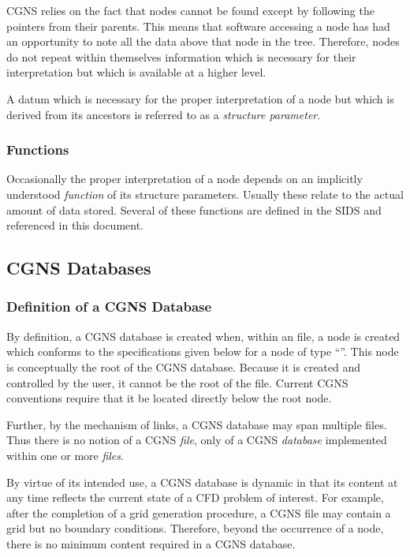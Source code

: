 CGNS relies on the fact that \SLL nodes cannot be found except by
following the pointers from their parents.  This means that software
accessing a node has had an opportunity to note all the data above that
node in the tree. Therefore, nodes do not repeat within themselves
information which is necessary for their interpretation but which is
available at a higher level.

A datum which is necessary for the proper interpretation of a
node but which is derived from its ancestors is referred to as a
\textit{structure parameter}.

\subsubsection{Functions}
\label{s:functions}

Occasionally the proper interpretation of a node depends on
an implicitly understood \emph{function} of its structure
parameters. Usually these relate to the actual amount of data
stored. Several of these functions are defined in the SIDS and
referenced in this document.

\subsection{CGNS Databases}
\label{s:cgns_databases}

\subsubsection{Definition of a CGNS Database}

By definition, a CGNS database is created when, within an \HDF file, a
node is created which conforms to the specifications given below for a
node of type ``''. This node is conceptually the root
of the CGNS database. Because it is created and controlled by the user,
it cannot be the root of the \HDF file.
Current CGNS conventions require that it be located directly below
the \HDF root node.

Further, by the mechanism of links, a CGNS database may span multiple
files. Thus there is no notion of a CGNS \emph{file}, only of a CGNS
\emph{database} implemented within one or more \emph{\HDF files}.

By virtue of its intended use, a CGNS database is dynamic in
that its content at any time reflects the current state of a CFD
problem of interest. For example, after the completion of a grid
generation procedure, a CGNS file may contain a grid but no boundary
conditions. Therefore, beyond the occurrence of a 
node, there is no minimum content required in a CGNS database.

